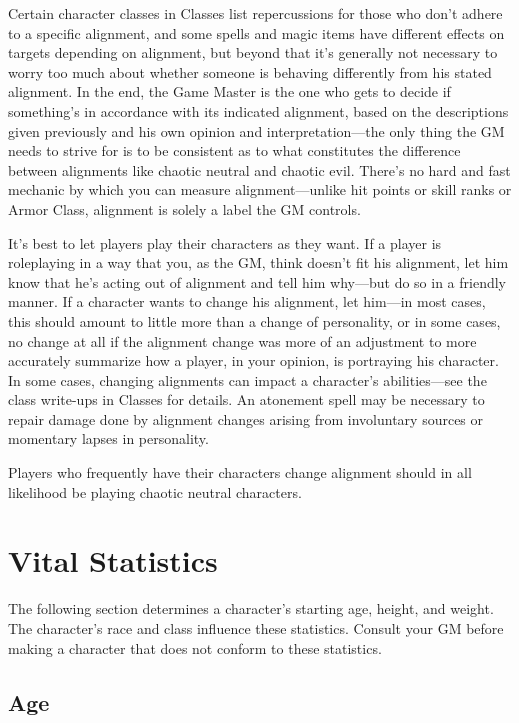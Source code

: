 Certain character classes in Classes list repercussions for those who don't adhere to a specific alignment, and some spells and magic items have different effects on targets depending on alignment, but beyond that it's generally not necessary to worry too much about whether someone is behaving differently from his stated alignment. In the end, the Game Master is the one who gets to decide if something's in accordance with its indicated alignment, based on the descriptions given previously and his own opinion and interpretation---the only thing the GM needs to strive for is to be consistent as to what constitutes the difference between alignments like chaotic neutral and chaotic evil. There's no hard and fast mechanic by which you can measure alignment---unlike hit points or skill ranks or Armor Class, alignment is solely a label the GM controls.
				
It's best to let players play their characters as they want. If a player is roleplaying in a way that you, as the GM, think doesn't fit his alignment, let him know that he's acting out of alignment and tell him why---but do so in a friendly manner. If a character wants to change his alignment, let him---in most cases, this should amount to little more than a change of personality, or in some cases, no change at all if the alignment change was more of an adjustment to more accurately summarize how a player, in your opinion, is portraying his character. In some cases, changing alignments can impact a character's abilities---see the class write-ups in Classes for details. An atonement spell may be necessary to repair damage done by alignment changes arising from involuntary sources or momentary lapses in personality.
				
Players who frequently have their characters change alignment should in all likelihood be playing chaotic neutral characters.
				
\section{Vital Statistics}

				
The following section determines a character's starting age, height, and weight. The character's race and class influence these statistics. Consult your GM before making a character that does not conform to these statistics.
				
\subsection{Age}

